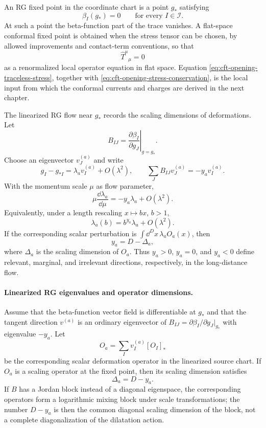 An RG fixed point in the coordinate chart is a point \(g_\ast\) satisfying
\begin{equation}
  \beta_I(g_\ast)=0
  \qquad
  \text{for every }I\in\mathcal I .
  \label{eq:cft-opening-fixed-point}
\end{equation}
At such a point the beta-function part of the trace vanishes.  A flat-space
conformal fixed point is obtained when the stress tensor can be chosen, by
allowed improvements and contact-term conventions, so that
\begin{equation}
  \widehat T^\mu{}_\mu=0
  \label{eq:cft-opening-traceless-stress}
\end{equation}
as a renormalized local operator equation in flat space.  Equation
\eqref{eq:cft-opening-traceless-stress}, together with
\eqref{eq:cft-opening-stress-conservation}, is the local input from which the
conformal currents and charges are derived in the next chapter.

The linearized RG flow near \(g_\ast\) records the scaling dimensions of
deformations.  Let
\[
  B_{IJ}
  =
  \left.
  \frac{\partial\beta_I}{\partial g_J}
  \right|_{g=g_\ast}.
\]
Choose an eigenvector \(v^{(a)}_J\) and write
\[
  g_I-g_{\ast I}=\lambda_a v^{(a)}_I+O(\lambda^2),
  \qquad
  \sum_J B_{IJ}v^{(a)}_J=-y_a v^{(a)}_I .
\]
With the momentum scale \(\mu\) as flow parameter,
\[
  \mu\frac{\dd\lambda_a}{\dd\mu}
  =
  -y_a\lambda_a+O(\lambda^2).
\]
Equivalently, under a length rescaling \(x\mapsto b x\), \(b>1\),
\[
  \lambda_a(b)=b^{y_a}\lambda_a+O(\lambda^2).
\]
If the corresponding scalar perturbation is
\(\int\dd^Dx\,\lambda_a O_a(x)\), then
\begin{equation}
  y_a=D-\Delta_a,
  \label{eq:cft-opening-y-delta}
\end{equation}
where \(\Delta_a\) is the scaling dimension of \(O_a\).  Thus \(y_a>0\),
\(y_a=0\), and \(y_a<0\) define relevant, marginal, and irrelevant
directions, respectively, in the long-distance flow.

\paragraph{Linearized RG eigenvalues and operator dimensions.}
Assume that the beta-function vector field is differentiable at \(g_\ast\)
and that the tangent direction \(v^{(a)}\) is an ordinary eigenvector of
\(B_{IJ}=\partial\beta_I/\partial g_J|_{g_\ast}\) with eigenvalue \(-y_a\).
Let
\[
  O_a=\sum_I v^{(a)}_I[O_I]_{\ast}
\]
be the corresponding scalar deformation operator in the linearized source
chart.  If \(O_a\) is a scaling operator at the fixed point, then its scaling
dimension satisfies
\[
  \Delta_a=D-y_a .
\]
If \(B\) has a Jordan block instead of a diagonal eigenspace, the corresponding
operators form a logarithmic mixing block under scale transformations; the
number \(D-y_a\) is then the common diagonal scaling dimension of the block,
not a complete diagonalization of the dilatation action.

